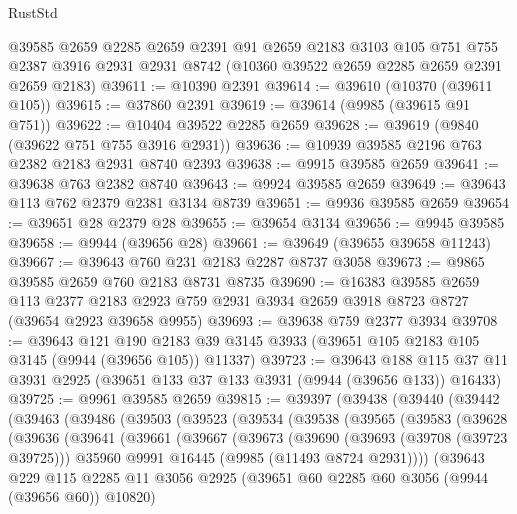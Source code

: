 \begin{lexlean}{RustStd}
\begin{coremodule}
    @39585
    @2659
    @2285
    @2659
    @2391
    @91
    @2659
    @2183
    @3103
    @105
    @751
    @755
    @2387
    @3916
    @2931
    @2931
    @8742
    (@10360 @39522 @2659 @2285 @2659 @2391 @2659 @2183)
@39611 := @10390 @2391
@39614 := @39610 (@10370 (@39611 @105))
@39615 := @37860 @2391
@39619 := @39614 (@9985 (@39615 @91 @751))
@39622 := @10404 @39522 @2285 @2659
@39628 := @39619 (@9840 (@39622 @751 @755 @3916 @2931))
@39636 := @10939 @39585 @2196 @763 @2382 @2183 @2931 @8740 @2393
@39638 := @9915 @39585 @2659
@39641 := @39638 @763 @2382 @8740
@39643 := @9924 @39585 @2659
@39649 := @39643 @113 @762 @2379 @2381 @3134 @8739
@39651 := @9936 @39585 @2659
@39654 := @39651 @28 @2379 @28
@39655 := @39654 @3134
@39656 := @9945 @39585
@39658 := @9944 (@39656 @28)
@39661 := @39649 (@39655 @39658 @11243)
@39667 := @39643 @760 @231 @2183 @2287 @8737 @3058
@39673 := @9865 @39585 @2659 @760 @2183 @8731 @8735
@39690 := @16383
    @39585
    @2659
    @113
    @2377
    @2183
    @2923
    @759
    @2931
    @3934
    @2659
    @3918
    @8723
    @8727
    (@39654 @2923 @39658 @9955)
@39693 := @39638 @759 @2377 @3934
@39708 := @39643
    @121
    @190
    @2183
    @39
    @3145
    @3933
    (@39651 @105 @2183 @105 @3145 (@9944 (@39656 @105)) @11337)
@39723 := @39643
    @188
    @115
    @37
    @11
    @3931
    @2925
    (@39651 @133 @37 @133 @3931 (@9944 (@39656 @133)) @16433)
@39725 := @9961 @39585 @2659
@39815 := @39397
    (@39438
      (@39440
        (@39442
          (@39463
            (@39486
              (@39503
                (@39523
                  (@39534
                    (@39538
                      (@39565
                        (@39583
                          (@39628
                            (@39636
                              (@39641
                                (@39661
                                  (@39667
                                    (@39673
                                      (@39690
                                        (@39693 (@39708 (@39723 @39725)))
                                        @35960
                                        @9991
                                        @16445
                                        (@9985 (@11493 @8724 @2931))))
                                    (@39643
                                      @229
                                      @115
                                      @2285
                                      @11
                                      @3056
                                      @2925
                                      (@39651 @60 @2285 @60 @3056 (@9944 (@39656 @60)) @10820)

\end{coremodule}
\end{lexlean}
